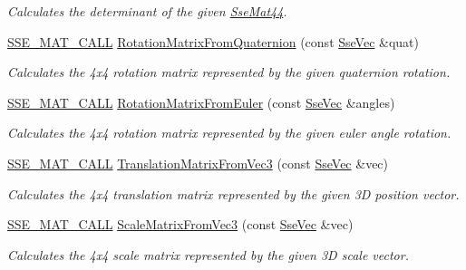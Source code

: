 \begin{DoxyCompactItemize}
\begin{DoxyCompactList}\small\item\em Calculates the determinant of the given \hyperlink{classgfxmath_1_1_sse_mat44}{Sse\+Mat44}. \end{DoxyCompactList}\item 
\hyperlink{ssemat__math__defs_8h_a741f88d5589197d03fea9ab2b7622b8a}{S\+S\+E\+\_\+\+M\+A\+T\+\_\+\+C\+A\+L\+L} \hyperlink{classgfxmath_1_1_sse_mat44_a786ee918eca59978387d6fce4dab5122}{Rotation\+Matrix\+From\+Quaternion} (const \hyperlink{namespacegfxmath_a0de2243e2b8d0fd46d3af5e036423004}{Sse\+Vec} \&quat)
\begin{DoxyCompactList}\small\item\em Calculates the 4x4 rotation matrix represented by the given quaternion rotation. \end{DoxyCompactList}\item 
\hyperlink{ssemat__math__defs_8h_a741f88d5589197d03fea9ab2b7622b8a}{S\+S\+E\+\_\+\+M\+A\+T\+\_\+\+C\+A\+L\+L} \hyperlink{classgfxmath_1_1_sse_mat44_ac11c40e17108aa72d069b01b6a08bebf}{Rotation\+Matrix\+From\+Euler} (const \hyperlink{namespacegfxmath_a0de2243e2b8d0fd46d3af5e036423004}{Sse\+Vec} \&angles)
\begin{DoxyCompactList}\small\item\em Calculates the 4x4 rotation matrix represented by the given euler angle rotation. \end{DoxyCompactList}\item 
\hyperlink{ssemat__math__defs_8h_a741f88d5589197d03fea9ab2b7622b8a}{S\+S\+E\+\_\+\+M\+A\+T\+\_\+\+C\+A\+L\+L} \hyperlink{classgfxmath_1_1_sse_mat44_a2b08e7c142f14df78883494d9c2f66e8}{Translation\+Matrix\+From\+Vec3} (const \hyperlink{namespacegfxmath_a0de2243e2b8d0fd46d3af5e036423004}{Sse\+Vec} \&vec)
\begin{DoxyCompactList}\small\item\em Calculates the 4x4 translation matrix represented by the given 3\+D position vector. \end{DoxyCompactList}\item 
\hyperlink{ssemat__math__defs_8h_a741f88d5589197d03fea9ab2b7622b8a}{S\+S\+E\+\_\+\+M\+A\+T\+\_\+\+C\+A\+L\+L} \hyperlink{classgfxmath_1_1_sse_mat44_a7971ccb3a66b526ba72c66477539c923}{Scale\+Matrix\+From\+Vec3} (const \hyperlink{namespacegfxmath_a0de2243e2b8d0fd46d3af5e036423004}{Sse\+Vec} \&vec)
\begin{DoxyCompactList}\small\item\em Calculates the 4x4 scale matrix represented by the given 3\+D scale vector. \end{DoxyCompactList}\item 

\end{DoxyCompactItemize}
